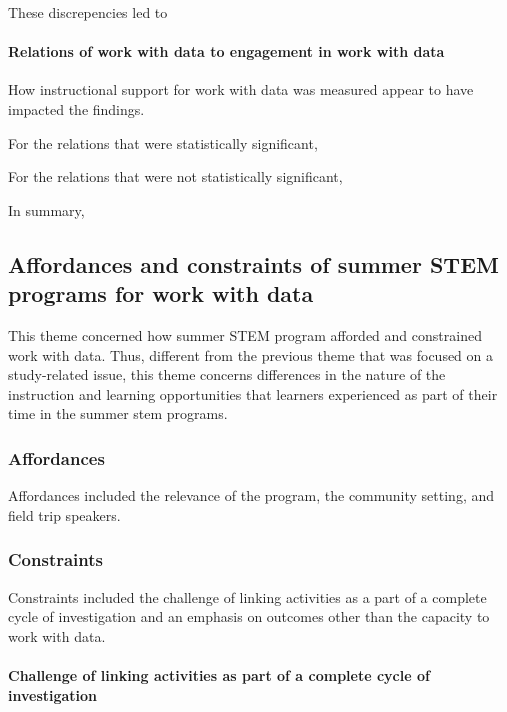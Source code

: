 \documentclass[]{msu-thesis}
\let\oldparagraph\paragraph
\renewcommand{\paragraph}[1]{\oldparagraph{#1}\mbox{}}
\theoremstyle{definition}
\theoremstyle{definition}
\theoremstyle{definition}
\theoremstyle{remark}
\begin{document}
These discrepencies led to

\paragraph{Relations of work with data to engagement in work with
data}\label{relations-of-work-with-data-to-engagement-in-work-with-data}

How instructional support for work with data was measured appear to have
impacted the findings.

For the relations that were statistically significant,

For the relations that were not statistically significant,

In summary,

\subsection{Affordances and constraints of summer STEM programs for work
with
data}\label{affordances-and-constraints-of-summer-stem-programs-for-work-with-data}

This theme concerned how summer STEM program afforded and constrained
work with data. Thus, different from the previous theme that was focused
on a study-related issue, this theme concerns differences in the nature
of the instruction and learning opportunities that learners experienced
as part of their time in the summer stem programs.

\subsubsection{Affordances}\label{affordances}

Affordances included the relevance of the program, the community
setting, and field trip speakers.

\subsubsection{Constraints}\label{constraints}

Constraints included the challenge of linking activities as a part of a
complete cycle of investigation and an emphasis on outcomes other than
the capacity to work with data.

\paragraph{Challenge of linking activities as part of a complete cycle
of
investigation}\label{challenge-of-linking-activities-as-part-of-a-complete-cycle-of-investigation}
\end{document}

